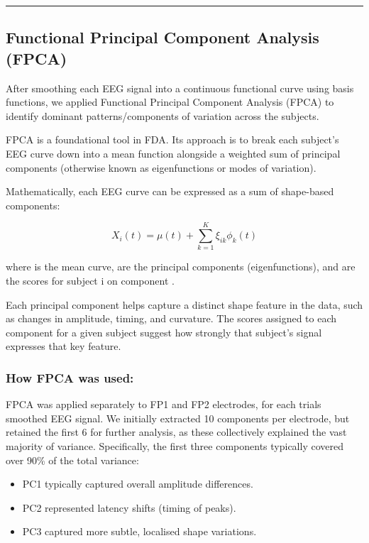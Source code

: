 \documentclass{article}
\begin{document}
\begin{center}\rule{0.5\linewidth}{0.5pt}\end{center}

\subsection{Functional Principal Component Analysis
(FPCA)}\label{functional-principal-component-analysis-fpca}

After smoothing each EEG signal into a continuous functional curve using
basis functions, we applied Functional Principal Component Analysis
(FPCA) to identify dominant patterns/components of variation across the
subjects.

FPCA is a foundational tool in FDA. Its approach is to break each
subject's EEG curve down into a mean function alongside a weighted sum
of principal components (otherwise known as eigenfunctions or modes of
variation).

Mathematically, each EEG curve can be expressed as a sum of shape-based
components:

\[
X_i(t) = \mu(t) + \sum_{k=1}^{K} \xi_{ik} \phi_k(t)
\]

where is the mean curve, are the principal components (eigenfunctions),
and are the scores for subject i on component .

Each principal component helps capture a distinct shape feature in the
data, such as changes in amplitude, timing, and curvature. The scores
assigned to each component for a given subject suggest how strongly that
subject's signal expresses that key feature.

\subsubsection{How FPCA was used:}\label{how-fpca-was-used}

FPCA was applied separately to FP1 and FP2 electrodes, for each trials
smoothed EEG signal. We initially extracted 10 components per electrode,
but retained the first 6 for further analysis, as these collectively
explained the vast majority of variance. Specifically, the first three
components typically covered over 90\% of the total variance:

\begin{itemize}
\item
  PC1 typically captured overall amplitude differences.
\item
  PC2 represented latency shifts (timing of peaks).
\item
  PC3 captured more subtle, localised shape variations.
\end{itemize}
\end{document}
